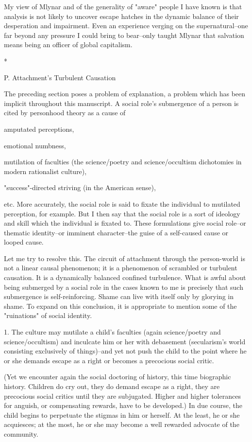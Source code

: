 My view of Mlynar and of the generality of "aware" people I have known is that analysis is not likely to uncover escape hatches in the dynamic balance of their desperation and impairment. Even an experience verging on the supernatural--one far beyond any pressure I could bring to bear--only taught Mlynar that salvation means being an officer of global capitalism.

*

P. Attachment's Turbulent Causation

The preceding section poses a problem of explanation, a problem which has been implicit throughout this manuscript. A social role's submergence of a person is cited by personhood theory as a cause of

    amputated perceptions,

    emotional numbness,

    mutilation of faculties (the science/poetry and science/occultism dichotomies in modern rationalist culture),

    "success"-directed striving (in the American sense),

etc. More accurately, the social role is said to fixate the individual to mutilated perception, for example. But I then say that the social role is a sort of ideology and skill which the individual is fixated to. These formulations give social role--or thematic identity--or imminent character--the guise of a self-caused cause or looped cause.

Let me try to resolve this. The circuit of attachment through the person-world is not a linear causal phenomenon; it is a phenomenon of scrambled or turbulent causation. It is a dynamically balanced confined turbulence. What is awful about being submerged by a social role in the cases known to me is precisely that such submergence is self-reinforcing. Shame can live with itself only by glorying in shame. To expand on this conclusion, it is appropriate to mention some of the "ruinations" of social identity.

1. The culture may mutilate a child's faculties (again science/poetry and science/occultism) and inculcate him or her with debasement (secularism's world consisting exclusively of things)--and yet not push the child to the point where he or she demands escape as a right or becomes a precocious social critic.

(Yet we encounter again the social doctoring of history, this time biographic history. Children do cry out, they do demand escape as a right, they are precocious social critics until they are subjugated. Higher and higher tolerances for anguish, or compensating rewards, have to be developed.) In due course, the child begins to perpetuate the stigmas in him or herself. At the least, he or she acquiesces; at the most, he or she may become a well rewarded advocate of the community.

